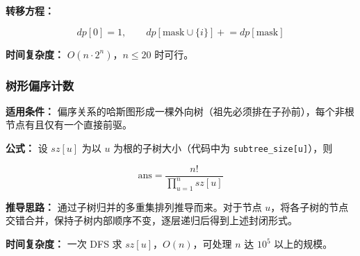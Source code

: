 \textbf{转移方程：}

\[
\mathit{dp}[0] = 1,\qquad
\mathit{dp}[\text{mask} \cup \{i\}] \mathrel{+}= \mathit{dp}[\text{mask}]
\]

\textbf{时间复杂度：} $O(n \cdot 2^n)$，$n \le 20$ 时可行。



\subsubsection{树形偏序计数}

\textbf{适用条件：} 偏序关系的哈斯图形成一棵外向树（祖先必须排在子孙前），每个非根节点有且仅有一个直接前驱。

\textbf{公式：} 设 $sz[u]$ 为以 $u$ 为根的子树大小（代码中为 \texttt{subtree\_size[u]}），则

\[
\text{ans} = \frac{n!}{\displaystyle\prod_{u=1}^{n} sz[u]}
\]

\textbf{推导思路：} 通过子树归并的多重集排列推导而来。对于节点 $u$，将各子树的节点交错合并，保持子树内部顺序不变，逐层递归后得到上述封闭形式。

\textbf{时间复杂度：} 一次 DFS 求 $sz[u]$，$O(n)$，可处理 $n$ 达 $10^5$ 以上的规模。


